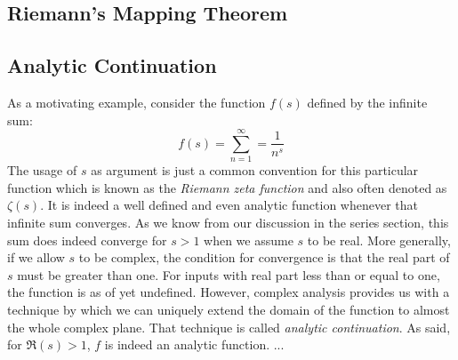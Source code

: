 





\subsection{Riemann's Mapping Theorem}



\subsection{Analytic Continuation}
As a motivating example, consider the function $f(s)$ defined by the infinite sum:
\begin{equation}
f(s) = \sum_{n=1}^{\infty} = \frac{1}{n^s}
\end{equation}
The usage of $s$ as argument is just a common convention for this particular function which is known as the \emph{Riemann zeta function} and also often denoted as $\zeta (s)$. It is indeed a well defined and even analytic function whenever that infinite sum converges. As we know from our discussion in the series section, this sum does indeed converge for $s > 1$ when we assume $s$ to be real. More generally, if we allow $s$ to be complex, the condition for convergence is that the real part of $s$ must be greater than one. For inputs with real part less than or equal to one, the function is as of yet undefined. However, complex analysis provides us with a technique by which we can uniquely extend the domain of the function to almost the whole complex plane. That technique is called \emph{analytic continuation}. As said, for $\Re(s) > 1$, $f$ is indeed an analytic function. ...



